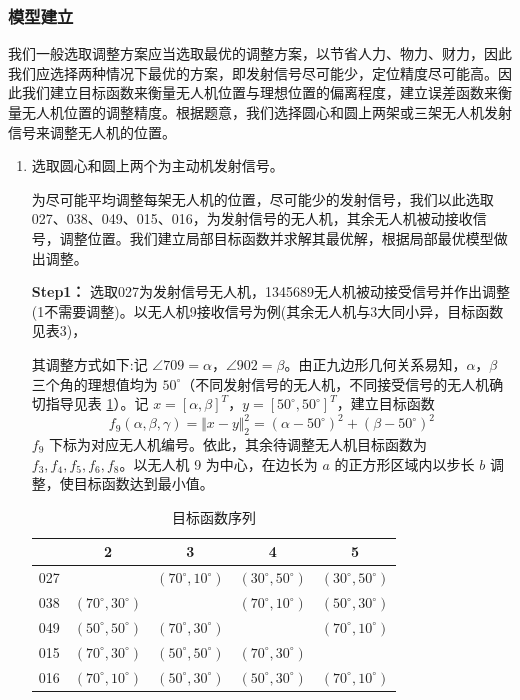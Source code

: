 \documentclass[withoutpreface,bwprint]{cumcmthesis} %
\begin{document}
\subsubsection{模型建立}

我们一般选取调整方案应当选取最优的调整方案，以节省人力、物力、财力，因此我们应选择两种情况下最优的方案，即发射信号尽可能少，定位精度尽可能高。因此我们建立目标函数来衡量无人机位置与理想位置的偏离程度，建立误差函数来衡量无人机位置的调整精度。根据题意，我们选择圆心和圆上两架或三架无人机发射信号来调整无人机的位置。

\begin{enumerate}
    \item 选取圆心和圆上两个为主动机发射信号。
    
        为尽可能平均调整每架无人机的位置，尽可能少的发射信号，我们以此选取027、038、049、015、016，为发射信号的无人机，其余无人机被动接收信号，调整位置。我们建立局部目标函数并求解其最优解，根据局部最优模型做出调整。

        \textbf{Step1：} 选取027为发射信号无人机，1345689无人机被动接受信号并作出调整(1不需要调整)。以无人机9接收信号为例(其余无人机与3大同小异，目标函数见表3)，
     
        其调整方式如下:记 $\angle 709 = \alpha$，$\angle 902 = \beta$。由正九边形几何关系易知，$\alpha$，$\beta$ 三个角的理想值均为 $50^\circ$（不同发射信号的无人机，不同接受信号的无人机确切指导见表 \ref{表3}）。记 $x = [\alpha, \beta]^T$，$y = [50^\circ, 50^\circ]^T$，建立目标函数
\[
f_9(\alpha, \beta, \gamma) = \Vert{x} - {y}\Vert_2^2 = (\alpha - 50^\circ)^2 + (\beta - 50^\circ)^2
\]
$f_9$ 下标为对应无人机编号。依此，其余待调整无人机目标函数为 $f_3, f_4, f_5, f_6, f_8$。以无人机 9 为中心，在边长为 $a$ 的正方形区域内以步长 $b$ 调整，使目标函数达到最小值。


\begin{table}[htbp]
  \centering
  \caption{目标函数序列}
  \label{表3}
  \begin{tabular}{ccccc}
    \toprule
    & 2 & 3 & 4 & 5 \\
    \midrule
    027 &  & $(70^\circ, 10^\circ)$ & $(30^\circ, 50^\circ)$ & $(30^\circ, 50^\circ)$ \\
    038 & $(70^\circ, 30^\circ)$ &  & $(70^\circ, 10^\circ)$ & $(50^\circ, 30^\circ)$ \\
    049 & $(50^\circ, 50^\circ)$ & $(70^\circ, 30^\circ)$ &  & $(70^\circ, 10^\circ)$ \\
    015 & $(70^\circ, 30^\circ)$ & $(50^\circ, 50^\circ)$ & $(70^\circ, 30^\circ)$ &  \\
    016 & $(70^\circ, 10^\circ)$ & $(50^\circ, 30^\circ)$ & $(50^\circ, 30^\circ)$ & $(70^\circ, 10^\circ)$ \\
    \bottomrule
  \end{tabular}
\end{table}


\end{enumerate}
\end{document}
